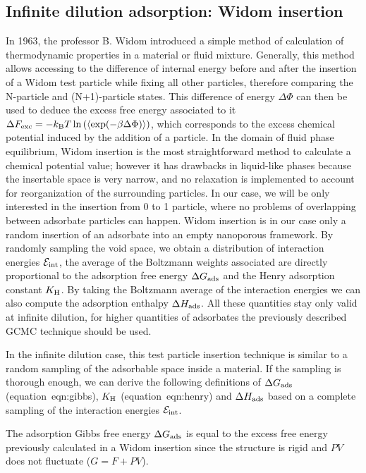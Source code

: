 \documentclass[main.tex]{subfiles}
\begin{document}
\subsection{Infinite dilution adsorption: Widom insertion}

In 1963, the professor B. Widom introduced a simple method of calculation of thermodynamic properties in a material or fluid mixture.\cite{Widom1963} Generally, this method allows accessing to the difference of internal energy before and after the insertion of a Widom test particle while fixing all other particles, therefore comparing the N-particle and (N+1)-particle states. This difference of energy $\Delta \Phi$ can then be used to deduce the excess free energy associated to it $\Delta F_{\text{exc}} = -k_{\text{B}} T \ln\left(\langle \exp(- \beta\Delta \Phi) \rangle\right)$, which corresponds to the excess chemical potential induced by the addition of a particle. In the domain of fluid phase equilibrium, Widom insertion is the most straightforward method to calculate a chemical potential value; however it has drawbacks in liquid-like phases because the insertable space is very narrow, and no relaxation is implemented to account for reorganization of the surrounding particles.\cite{Nezbeda_1991} In our case, we will be only interested in the insertion from 0 to 1 particle, where no problems of overlapping between adsorbate particles can happen. Widom insertion is in our case only a random insertion of an adsorbate into an empty nanoporous framework. By randomly sampling the void space, we obtain a distribution of interaction energies $\mathcal{E}_{\text{int}}$, the average of the Boltzmann weights associated are directly proportional to the adsorption free energy $\Delta G_{\text{ads}}$ and the Henry adsorption constant $K_{\text{H}}$. By taking the Boltzmann average of the interaction energies we can also compute the adsorption enthalpy $\Delta H_{\text{ads}}$. All these quantities stay only valid at infinite dilution, for higher quantities of adsorbates the previously described GCMC technique should be used.  

In the infinite dilution case, this test particle insertion technique is similar to a random sampling of the adsorbable space inside a material. If the sampling is thorough enough, we can derive the following definitions of $\Delta G_{\text{ads}}$ (equation~{eqn:gibbs}), $K_{\text{H}}$ (equation~{eqn:henry}) and $\Delta H_{\text{ads}}$ based on a complete sampling of the interaction energies $\mathcal{E}_{\text{int}}$. 

The adsorption Gibbs free energy $\Delta G_{\text{ads}}$ is equal to the excess free energy previously calculated in a Widom insertion since the structure is rigid and $PV$ does not fluctuate ($G = F + PV$). 
\end{document}
